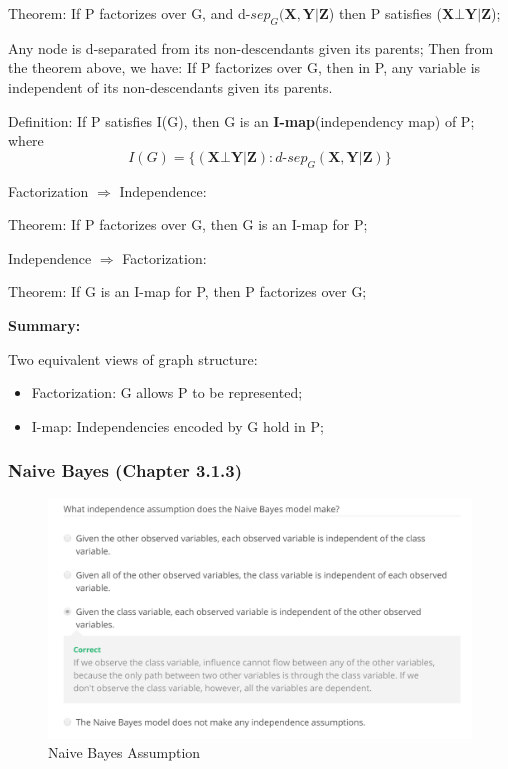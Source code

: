 \documentclass[12pt]{article}
\numberwithin{equation}{section}
\begin{document}
Theorem: If P factorizes over G, and d-$sep_{G}
(\mathbf{X},\mathbf{Y}|\mathbf{Z}$) then P satisfies ($\mathbf{X} \bot \mathbf{Y} | \mathbf{Z}$);

Any node is d-separated from its non-descendants given its parents;
Then from the theorem above, we have:
If P factorizes over G, then in P, any variable is independent of its non-descendants given its parents.

Definition: If P satisfies I(G), then G is an \textbf{I-map}(independency map) of P; where
\[I(G)=\{(\mathbf{X} \bot \mathbf{Y} | \mathbf{Z}):d\text{-}sep_{G}
	(\mathbf{X},\mathbf{Y}|\mathbf{Z})\} \]

Factorization $\Rightarrow$ Independence:

Theorem: If P factorizes over G, then G is an I-map for P;

Independence $\Rightarrow$ Factorization:

Theorem: If G is an I-map for P, then P factorizes over G;

\textbf{Summary:} 

Two equivalent views of graph structure:
\begin{itemize}
	\item Factorization: G allows P to be represented;
	\item I-map: Independencies encoded by G hold in P;
\end{itemize}

\subsubsection{Naive Bayes (Chapter 3.1.3)}
\begin{figure}[H]
	\includegraphics[width=\linewidth]{PGMpics/NaiveBayes.png}
	\caption{Naive Bayes Assumption}
	\label{fig:NaiveBayes}
\end{figure}
\end{document}
